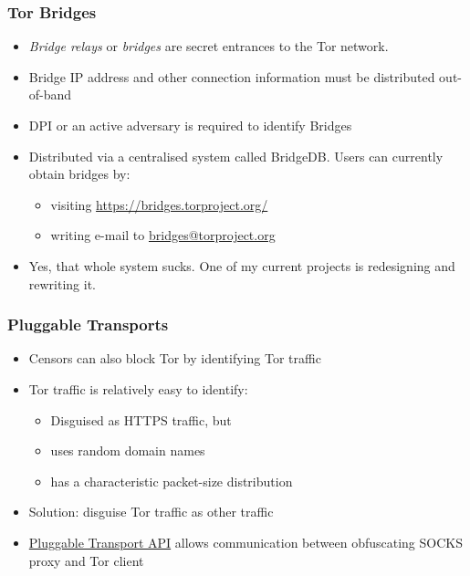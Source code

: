 \begin{frame}
  \frametitle{Tor Bridges}

  \begin{itemize}
  \item \emph{Bridge relays} or \emph{bridges} are secret entrances to the Tor
    network.
  \item<2-> Bridge IP address and other connection information must be
    distributed out-of-band
  \item<3-> DPI or an active adversary is required to identify Bridges
  \item<4-> Distributed via a centralised system called BridgeDB. Users can
    currently obtain bridges by:
      \begin{itemize}
        \item visiting \url{https://bridges.torproject.org/}
        \item writing e-mail to \href{mailto:bridges@torproject.org}{bridges@torproject.org}
      \end{itemize}
  \item<5-> Yes, that whole system sucks.  One of my current projects is
    redesigning and rewriting it.
  \end{itemize}
\end{frame}


\begin{frame}
  \frametitle{Pluggable Transports}
  \begin{itemize}
    \item Censors can also block Tor by identifying Tor traffic
    \item<2-> Tor traffic is relatively easy to identify:
      \begin{itemize}
        \item Disguised as HTTPS traffic, but
        \item uses random domain names 
        \item has a characteristic packet-size distribution
      \end{itemize}
    \item<3-> Solution: disguise Tor traffic as other traffic
    \item<3->
      \href{https://www.torproject.org/docs/pluggable-transports.html.en}{Pluggable
        Transport API} allows communication between obfuscating SOCKS proxy and
      Tor client
  \end{itemize}
\end{frame}


